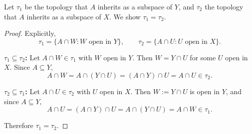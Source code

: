 
Let $\tau_1$ be the topology that $A$ inherits as a subspace of $Y$, and $\tau_2$ the topology
that $A$ inherits as a subspace of $X$. We show $\tau_1=\tau_2$.

\begin{proof}
Explicitly,
\[ \tau_1=\{A\cap W : W \text{ open in } Y\},\qquad \tau_2=\{A\cap U : U \text{ open in } X\}. \]

\textbf{$\tau_1\subseteq\tau_2$:} Let $A\cap W\in\tau_1$ with $W$ open in $Y$. Then $W=Y\cap U$
for some $U$ open in $X$. Since $A\subseteq Y$,
\[ A\cap W=A\cap(Y\cap U)=(A\cap Y)\cap U=A\cap U\in\tau_2. \]

\textbf{$\tau_2\subseteq\tau_1$:} Let $A\cap U\in\tau_2$ with $U$ open in $X$. Then
$W:=Y\cap U$ is open in $Y$, and since $A\subseteq Y$,
\[ A\cap U=(A\cap Y)\cap U=A\cap(Y\cap U)=A\cap W\in\tau_1. \]

Therefore $\tau_1=\tau_2$.
\end{proof}
